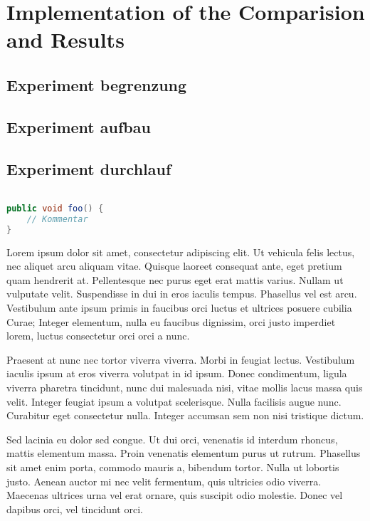 \documentclass[12pt,oneside,a4paper,parskip]{scrbook}
\begin{document}
\section{Implementation of the Comparision and Results}

\subsection{Experiment begrenzung}

\subsection{Experiment aufbau}

\subsection{Experiment durchlauf}

\begin{lstlisting}[label=lst:java,
				   language=java,
				   firstnumber=1,
				   caption=Beispiel für einen Quelltext]				   

public void foo() {				   
	// Kommentar
}
\end{lstlisting}

Lorem ipsum dolor sit amet, consectetur adipiscing elit. Ut vehicula felis lectus, nec aliquet arcu aliquam vitae. Quisque laoreet consequat ante, eget pretium quam hendrerit at. Pellentesque nec purus eget erat mattis varius. Nullam ut vulputate velit. Suspendisse in dui in eros iaculis tempus. Phasellus vel est arcu. Vestibulum ante ipsum primis in faucibus orci luctus et ultrices posuere cubilia Curae; Integer elementum, nulla eu faucibus dignissim, orci justo imperdiet lorem, luctus consectetur orci orci a nunc.

Praesent at nunc nec tortor viverra viverra. Morbi in feugiat lectus. Vestibulum iaculis ipsum at eros viverra volutpat in id ipsum. Donec condimentum, ligula viverra pharetra tincidunt, nunc dui malesuada nisi, vitae mollis lacus massa quis velit. Integer feugiat ipsum a volutpat scelerisque. Nulla facilisis augue nunc. Curabitur eget consectetur nulla. Integer accumsan sem non nisi tristique dictum.

Sed lacinia eu dolor sed congue. Ut dui orci, venenatis id interdum rhoncus, mattis elementum massa. Proin venenatis elementum purus ut rutrum. Phasellus sit amet enim porta, commodo mauris a, bibendum tortor. Nulla ut lobortis justo. Aenean auctor mi nec velit fermentum, quis ultricies odio viverra. Maecenas ultrices urna vel erat ornare, quis suscipit odio molestie. Donec vel dapibus orci, vel tincidunt orci.
\end{document}
